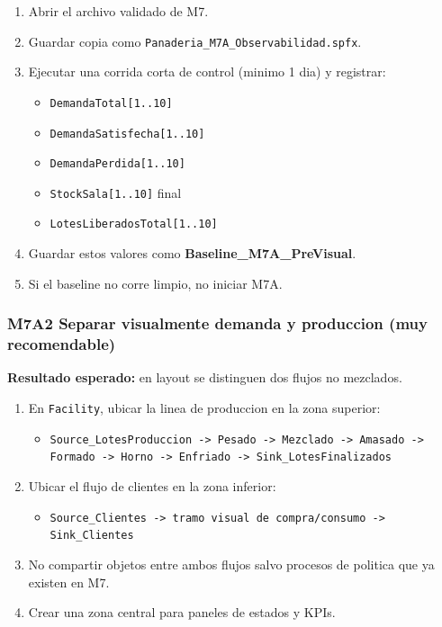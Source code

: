 \documentclass[11pt]{article}
\newcommand{\simio}[1]{\texttt{#1}}
\newcommand{\state}[1]{\texttt{#1}}
\begin{document}
\begin{enumerate}
  \item Abrir el archivo validado de M7.
  \item Guardar copia como \simio{Panaderia\_M7A\_Observabilidad.spfx}.
  \item Ejecutar una corrida corta de control (minimo 1 dia) y registrar:
  \begin{itemize}
    \item \state{DemandaTotal[1..10]}
    \item \state{DemandaSatisfecha[1..10]}
    \item \state{DemandaPerdida[1..10]}
    \item \state{StockSala[1..10]} final
    \item \state{LotesLiberadosTotal[1..10]}
  \end{itemize}
  \item Guardar estos valores como \textbf{Baseline\_M7A\_PreVisual}.
  \item Si el baseline no corre limpio, no iniciar M7A.
\end{enumerate}

\subsubsection{M7A2 Separar visualmente demanda y produccion (muy recomendable)}
\textbf{Resultado esperado:} en layout se distinguen dos flujos no mezclados.

\begin{enumerate}
  \item En \simio{Facility}, ubicar la linea de produccion en la zona superior:
  \begin{itemize}
    \item \simio{Source\_LotesProduccion -> Pesado -> Mezclado -> Amasado -> Formado -> Horno -> Enfriado -> Sink\_LotesFinalizados}
  \end{itemize}
  \item Ubicar el flujo de clientes en la zona inferior:
  \begin{itemize}
    \item \simio{Source\_Clientes -> tramo visual de compra/consumo -> Sink\_Clientes}
  \end{itemize}
  \item No compartir objetos entre ambos flujos salvo procesos de politica que ya existen en M7.
  \item Crear una zona central para paneles de estados y KPIs.
\end{enumerate}
\end{document}
